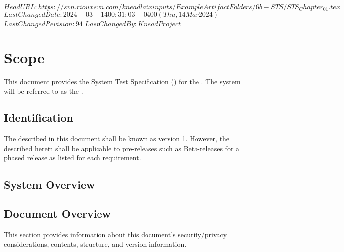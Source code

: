 \svnidlong
{$HeadURL: https://svn.riouxsvn.com/kneadlatxinputs/ExampleArtifactFolders/6b-STS/STS_Chapter_01.tex $}
{$LastChangedDate: 2024-03-14 00:31:03 -0400 (Thu, 14 Mar 2024) $}
{$LastChangedRevision: 94 $}
{$LastChangedBy: KneadProject $}

\chapter{Scope}
\label{chap:Scope}


This document provides the System Test Specification (\STS) for the \ThisSystem. 
The system will be referred to as the \ThisSys.

\section{Identification}
\label{sec:Identification}


The \ThisSystem described in this document shall be known as \ThisSys version 1.
However, the \STS described herein shall be applicable to pre-releases such as Beta-releases for a phased release as listed for each requirement.

\section{System Overview}
\label{sec:SystemOverview}





\section{Document Overview}
\label{loc:DocumentOverview}


This section provides information about this document's security/privacy considerations, contents, structure, and version information.







